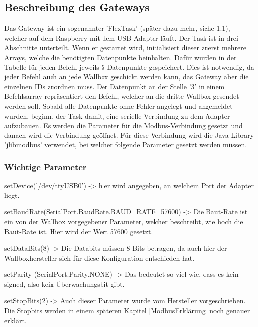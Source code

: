 \subsection{Beschreibung des Gateways} 
Das Gateway ist ein sogenannter 'FlexTask' (später dazu mehr, siehe 1.1), welcher auf dem Raspberry mit dem USB-Adapter läuft. Der Task ist in drei Abschnitte unterteilt. Wenn er gestartet wird, initialisiert dieser zuerst mehrere Arrays, welche die benötigten Datenpunkte beinhalten. Dafür wurden in der Tabelle für jeden Befehl jeweils 5 Datenpunkte gespeichert. Dies ist notwendig, da jeder Befehl auch an jede Wallbox geschickt werden kann, das Gateway aber die einzelnen IDs zuordnen muss. Der Datenpunkt an der Stelle '3' in einem Befehlsarray repräsentiert den Befehl, welcher an die dritte Wallbox gesendet werden soll.
Sobald alle Datenpunkte ohne Fehler angelegt und angemeldet wurden, beginnt der Task damit, eine serielle Verbindung zu dem Adapter aufzubauen. Es werden die Parameter für die Modbus-Verbindung gesetzt und danach wird die Verbindung geöffnet. Für diese Verbindung wird die Java Library 'jlibmodbus' verwendet, bei welcher folgende Parameter gesetzt werden müssen.

\subsubsection*{Wichtige Parameter} 


\begin{compactitem}
  \item setDevice('/dev/ttyUSB0') -> hier wird angegeben, an welchem Port der Adapter liegt.
  \item setBaudRate(SerialPort.BaudRate.BAUD\_RATE\_57600) -> Die Baut-Rate ist ein von der Wallbox vorgegebener Parameter, welcher beschreibt, wie hoch die Baut-Rate ist. Hier wird der Wert 57600 gesetzt.
  \item setDataBits(8) -> Die Databits müssen 8 Bits betragen, da auch hier der Wallboxhersteller sich für diese Konfiguration entschieden hat.
  \item setParity (SerialPort.Parity.NONE) -> Das bedeutet so viel wie, dass es kein signed, also kein Überwachungsbit gibt.
  \item setStopBits(2) -> Auch dieser Parameter wurde vom Hersteller vorgeschrieben. Die Stopbits werden in einem späteren Kapitel \ref{ModbusErklärung} noch genauer erklärt.
\end{compactitem}

